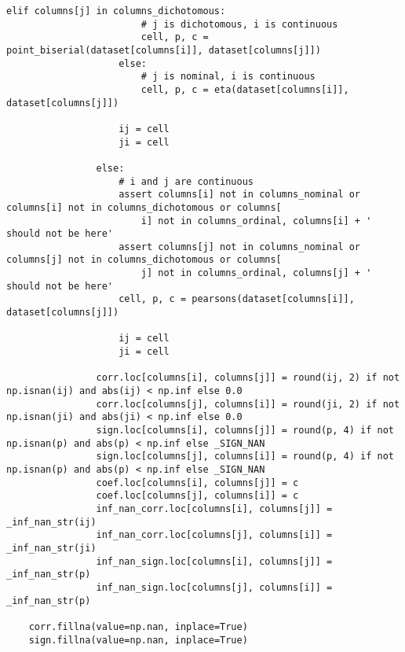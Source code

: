 \begin{lstlisting}[basicstyle=\tiny, style=py, caption={Implementation of \textit{compute correlations}}, label=lst:compute_correlation]
                    elif columns[j] in columns_dichotomous:
                        # j is dichotomous, i is continuous
                        cell, p, c = point_biserial(dataset[columns[i]], dataset[columns[j]])
                    else:
                        # j is nominal, i is continuous
                        cell, p, c = eta(dataset[columns[i]], dataset[columns[j]])
    
                    ij = cell
                    ji = cell
    
                else:
                    # i and j are continuous
                    assert columns[i] not in columns_nominal or columns[i] not in columns_dichotomous or columns[
                        i] not in columns_ordinal, columns[i] + ' should not be here'
                    assert columns[j] not in columns_nominal or columns[j] not in columns_dichotomous or columns[
                        j] not in columns_ordinal, columns[j] + ' should not be here'
                    cell, p, c = pearsons(dataset[columns[i]], dataset[columns[j]])
    
                    ij = cell
                    ji = cell
    
                corr.loc[columns[i], columns[j]] = round(ij, 2) if not np.isnan(ij) and abs(ij) < np.inf else 0.0
                corr.loc[columns[j], columns[i]] = round(ji, 2) if not np.isnan(ji) and abs(ji) < np.inf else 0.0
                sign.loc[columns[i], columns[j]] = round(p, 4) if not np.isnan(p) and abs(p) < np.inf else _SIGN_NAN
                sign.loc[columns[j], columns[i]] = round(p, 4) if not np.isnan(p) and abs(p) < np.inf else _SIGN_NAN
                coef.loc[columns[i], columns[j]] = c
                coef.loc[columns[j], columns[i]] = c
                inf_nan_corr.loc[columns[i], columns[j]] = _inf_nan_str(ij)
                inf_nan_corr.loc[columns[j], columns[i]] = _inf_nan_str(ji)
                inf_nan_sign.loc[columns[i], columns[j]] = _inf_nan_str(p)
                inf_nan_sign.loc[columns[j], columns[i]] = _inf_nan_str(p)
    
    corr.fillna(value=np.nan, inplace=True)
    sign.fillna(value=np.nan, inplace=True)
\end{lstlisting}

